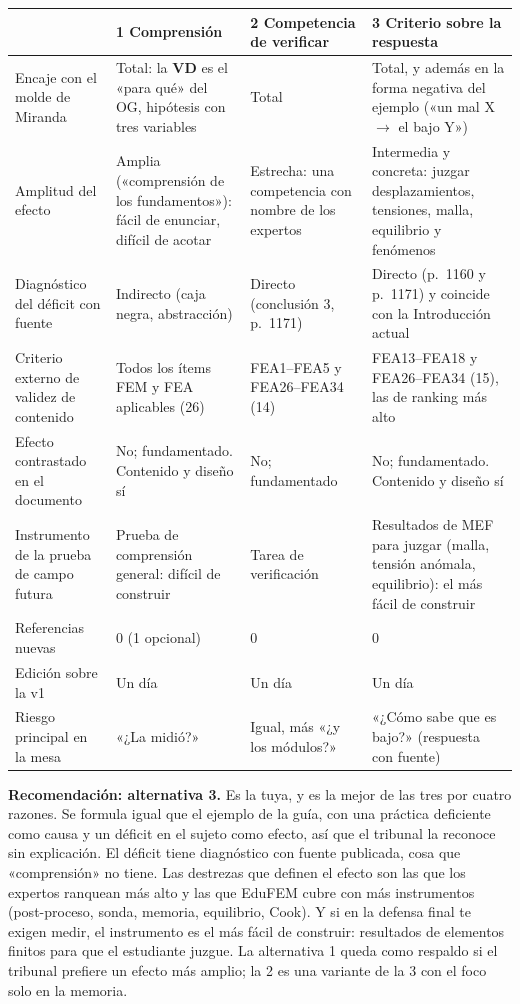 \documentclass[11pt,a4paper]{article}
\newcommand{\vd}{\textbf{VD}}
\begin{document}
\begin{longtable}{L{2.6cm}L{4.2cm}L{4.2cm}L{4.2cm}}
\toprule
& \textbf{1 Comprensión} & \textbf{2 Competencia de verificar} & \textbf{3 Criterio sobre la respuesta} \\
\midrule
\endhead
Encaje con el molde de Miranda & Total: la \vd{} es el «para qué» del OG, hipótesis con tres variables & Total & Total, y además en la forma negativa del ejemplo («un mal X $\to$ el bajo Y») \\
Amplitud del efecto & Amplia («comprensión de los fundamentos»): fácil de enunciar, difícil de acotar & Estrecha: una competencia con nombre de los expertos & Intermedia y concreta: juzgar desplazamientos, tensiones, malla, equilibrio y fenómenos \\
Diagnóstico del déficit con fuente & Indirecto (caja negra, abstracción) & Directo (conclusión 3, p.~1171) & Directo (p.~1160 y p.~1171) y coincide con la Introducción actual \\
Criterio externo de validez de contenido & Todos los ítems FEM y FEA aplicables (26) & FEA1--FEA5 y FEA26--FEA34 (14) & FEA13--FEA18 y FEA26--FEA34 (15), las de ranking más alto \\
Efecto contrastado en el documento & No; fundamentado. Contenido y diseño sí & No; fundamentado & No; fundamentado. Contenido y diseño sí \\
Instrumento de la prueba de campo futura & Prueba de comprensión general: difícil de construir & Tarea de verificación & Resultados de MEF para juzgar (malla, tensión anómala, equilibrio): el más fácil de construir \\
Referencias nuevas & 0 (1 opcional) & 0 & 0 \\
Edición sobre la v1 & Un día & Un día & Un día \\
Riesgo principal en la mesa & «¿La midió?» & Igual, más «¿y los módulos?» & «¿Cómo sabe que es bajo?» (respuesta con fuente) \\
\bottomrule
\end{longtable}

\textbf{Recomendación: alternativa 3.} Es la tuya, y es la mejor de las tres por cuatro razones. Se formula igual que el ejemplo de la guía, con una práctica deficiente como causa y un déficit en el sujeto como efecto, así que el tribunal la reconoce sin explicación. El déficit tiene diagnóstico con fuente publicada, cosa que «comprensión» no tiene. Las destrezas que definen el efecto son las que los expertos ranquean más alto y las que EduFEM cubre con más instrumentos (post-proceso, sonda, memoria, equilibrio, Cook). Y si en la defensa final te exigen medir, el instrumento es el más fácil de construir: resultados de elementos finitos para que el estudiante juzgue. La alternativa 1 queda como respaldo si el tribunal prefiere un efecto más amplio; la 2 es una variante de la 3 con el foco solo en la memoria.
\end{document}
